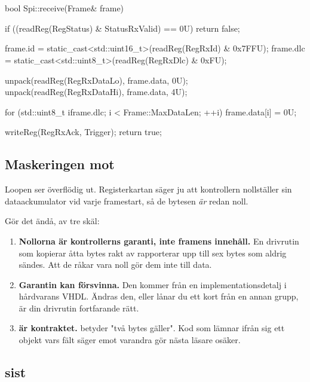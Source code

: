 \section{\texorpdfstring{}{receive()}}
\label{sec:receive}

\begin{cppcode}
bool Spi::receive(Frame& frame)
{
    if ((readReg(RegStatus) & StatusRxValid) == 0U) { return false; }

    frame.id  = static_cast<std::uint16_t>(readReg(RegRxId) & 0x7FFU);
    frame.dlc = static_cast<std::uint8_t>(readReg(RegRxDlc) & 0xFU);

    unpack(readReg(RegRxDataLo), frame.data, 0U);
    unpack(readReg(RegRxDataHi), frame.data, 4U);

    for (std::uint8_t i{frame.dlc}; i < Frame::MaxDataLen; ++i)
    {
        frame.data[i] = 0U;
    }

    writeReg(RegRxAck, Trigger);
    return true;
}
\end{cppcode}

\subsection{Maskeringen mot \texorpdfstring{}{dlc}}

Loopen ser överflödig ut. Registerkartan säger ju att kontrollern nollställer sin dataackumulator
vid varje framestart, så de bytesen \emph{är} redan noll.

Gör det ändå, av tre skäl:

\begin{enumerate}
  \item \textbf{Nollorna är kontrollerns garanti, inte framens innehåll.} En drivrutin som
    kopierar åtta bytes rakt av rapporterar upp till sex bytes som aldrig sändes. Att de råkar
    vara noll gör dem inte till data.
  \item \textbf{Garantin kan försvinna.} Den kommer från en implementationsdetalj i hårdvarans
    VHDL. Ändras den, eller lånar du ett kort från en annan grupp, är din drivrutin fortfarande
    rätt.
  \item \textbf{ är kontraktet.}  betyder "två bytes gäller". Kod
    som lämnar ifrån sig ett objekt vars fält säger emot varandra gör nästa läsare osäker.
\end{enumerate}

\subsection{\texorpdfstring{}{RX\_ACK} sist}

